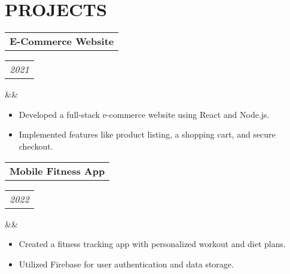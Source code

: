 \documentclass[11pt,a4paper,roman]{moderncv}
\makeatletter
\newcommand*{\customcvproject}[4][.25em]{
  \begin{tabular}{@{}l} 
    {\small\bfseries #2} 
  \end{tabular}
  \hfill
  \begin{tabular}{l@{}}
     {\footnotesize\itshape #3}
  \end{tabular}
  \ifx&#4&
  \else{\
    \begin{minipage}{\maincolumnwidth}%
      \footnotesize #4
    \end{minipage}}\fi
  \par\addvspace{#1}
}
\makeatother
\begin{document}
\section{PROJECTS}
\customcvproject{E-Commerce Website}{2021}{}{
    \begin{itemize}
        \item Developed a full-stack e-commerce website using React and Node.js.
        \item Implemented features like product listing, a shopping cart, and secure checkout.
    \end{itemize}
}
\customcvproject{Mobile Fitness App}{2022}{}{
    \begin{itemize}
        \item Created a fitness tracking app with personalized workout and diet plans.
        \item Utilized Firebase for user authentication and data storage.
    \end{itemize}
}
\end{document}
